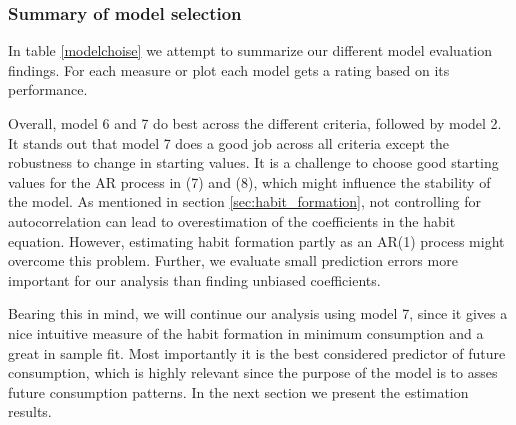 \subsubsection{Summary of model selection}
In table \ref{modelchoise} we attempt to summarize our different model evaluation findings. For each measure or plot each model gets a rating based on its performance.
\begin{table}[H]
\centering
\caption{Models rated in different criteria}
\label{modelchoise}
\end{table}
Overall, model 6 and 7 do best across the different criteria, followed by model 2. It stands out that model 7 does a good job across all criteria except the robustness to change in starting values. It is a challenge to choose good starting values for the AR process in (7) and (8), which might influence the stability of the model. As mentioned in section \ref{sec:habit_formation}, not controlling for autocorrelation can lead to overestimation of the coefficients in the habit equation. However, estimating habit formation partly as an AR(1) process might overcome this problem. Further, we evaluate small prediction errors more important for our analysis than finding unbiased coefficients. 

Bearing this in mind, we will continue our analysis using model 7, since it gives a nice intuitive measure of the habit formation in minimum consumption and a great in sample fit. Most importantly it is the best considered predictor of future consumption, which is highly relevant since the purpose of the model is to asses future consumption patterns. In the next section we present the estimation results.